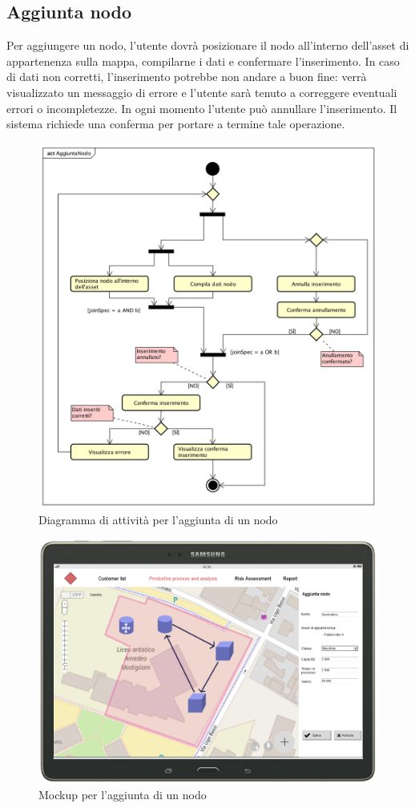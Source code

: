 \subsection{Aggiunta nodo}
Per aggiungere un nodo, l'utente dovrà posizionare il nodo all'interno dell'asset di appartenenza sulla mappa, compilarne i dati e confermare l'inserimento. In caso di dati non corretti, l'inserimento potrebbe non andare a buon fine: verrà visualizzato un messaggio di errore e l'utente sarà tenuto a correggere eventuali errori o incompletezze.
In ogni momento l'utente può annullare l'inserimento. Il sistema richiede una conferma per portare a termine tale operazione. 
\begin{figure}[H]
	\centering
	\includegraphics[width=\textwidth]{img/DiagrammiDiAttivita/AggiuntaNodo.png}
	\caption{Diagramma di attività per l'aggiunta di un nodo}
\end{figure}
\begin{figure}[H]
	\centering
	\includegraphics[width=\textwidth]{img/MockUp/m12.png}
	\caption{Mockup per l'aggiunta di un nodo}
\end{figure}

